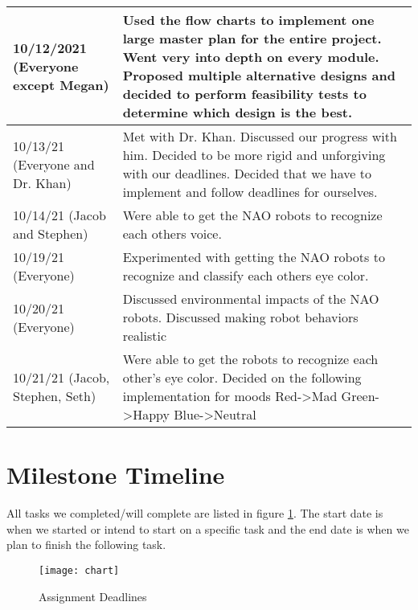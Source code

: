 \begin{table}
\begin{tabular}{| l | p{8cm} |}
      \hline
      10/12/2021 (Everyone except Megan)&Used the flow charts to implement one large master plan for the entire project. Went very into depth on every module. Proposed multiple alternative designs and decided to perform feasibility tests to determine which design is the best.\\
      \hline
      10/13/21 (Everyone and Dr. Khan)&Met with Dr. Khan. Discussed our progress with him.  Decided to be more rigid and unforgiving with our deadlines. Decided that we have to implement and follow deadlines for ourselves.\\
      \hline
      10/14/21 (Jacob and Stephen)&Were able to get the NAO robots to recognize each others voice.\\
      \hline
      10/19/21 (Everyone)&Experimented with getting the NAO robots to recognize and classify each others eye color.\\
      \hline
      10/20/21 (Everyone)&Discussed environmental impacts of the NAO robots. Discussed making robot behaviors realistic \\
      \hline
      10/21/21 (Jacob, Stephen, Seth)&Were able to get the robots to recognize each other’s eye color. Decided on the following implementation for moods Red->Mad Green->Happy Blue->Neutral\\
      \hline

    \end{tabular}
  \end{table}


\section{Milestone Timeline}
All tasks we completed/will complete are listed in figure \ref{fig:Deadlines}. The start date is when we started or intend to start on a specific task and the end date is when we plan to finish the following task. \par 

\begin{figure}
    \centering
    \texttt{[image: chart]}
    \caption{Assignment Deadlines}
    \label{fig:Deadlines}
  \end{figure}
